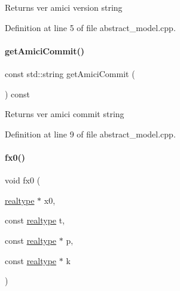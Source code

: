 \begin{DoxyReturn}{Returns}
ver amici version string 
\end{DoxyReturn}


Definition at line 5 of file abstract\+\_\+model.\+cpp.

\mbox{\label{classamici_1_1_abstract_model_ab04fc6e12be695c32736b8b36d1e262d}} 
\paragraph{\texorpdfstring{getAmiciCommit()}{getAmiciCommit()}}
{\footnotesize\ttfamily const std\+::string get\+Amici\+Commit (\begin{DoxyParamCaption}{ }\end{DoxyParamCaption}) const\hspace{0.3cm}{\ttfamily [virtual]}}

\begin{DoxyReturn}{Returns}
ver amici commit string 
\end{DoxyReturn}


Definition at line 9 of file abstract\+\_\+model.\+cpp.

\mbox{\label{classamici_1_1_abstract_model_a9863c3f8901cee9620c78b3065736cf8}} 
\paragraph{\texorpdfstring{fx0()}{fx0()}}
{\footnotesize\ttfamily void fx0 (\begin{DoxyParamCaption}\item[{\mbox{\hyperlink{namespaceamici_a1bdce28051d6a53868f7ccbf5f2c14a3}{realtype}} $\ast$}]{x0,  }\item[{const \mbox{\hyperlink{namespaceamici_a1bdce28051d6a53868f7ccbf5f2c14a3}{realtype}}}]{t,  }\item[{const \mbox{\hyperlink{namespaceamici_a1bdce28051d6a53868f7ccbf5f2c14a3}{realtype}} $\ast$}]{p,  }\item[{const \mbox{\hyperlink{namespaceamici_a1bdce28051d6a53868f7ccbf5f2c14a3}{realtype}} $\ast$}]{k }\end{DoxyParamCaption})\hspace{0.3cm}{\ttfamily [virtual]}}

